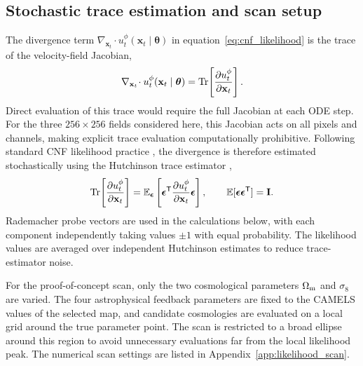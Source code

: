 \documentclass{article}
\newcommand{\Om}{\Omega_{\rm m}}
\newcommand{\sig}{\sigma_8}
\newcommand{\thetavec}{\boldsymbol{\theta}}
\begin{document}
\subsection{Stochastic trace estimation and scan setup}
\label{sec:likelihood_hutchinson}
The divergence term
$\nabla_{\mathbf{x}_t}\!\cdot
u_t^\phi(\mathbf{x}_t\mid\thetavec)$ in
equation~\eqref{eq:cnf_likelihood} is the trace of the velocity-field
Jacobian,
\begin{equation}
  \nabla_{\mathbf{x}_t}\!\cdot
  u_t^\phi(\mathbf{x}_t\mid\thetavec)
  =
  {\rm Tr}\!\left[
    \frac{\partial u_t^\phi}{\partial \mathbf{x}_t}
  \right].
  \label{eq:trace_exact}
\end{equation}
Direct evaluation of this trace would require the full Jacobian at each
ODE step. For the three $256\times256$ fields considered here, this
Jacobian acts on all pixels and channels, making explicit trace
evaluation computationally prohibitive. Following standard CNF
likelihood practice \citep{Grathwohl2019,Lipman2023}, the divergence is
therefore estimated stochastically using the Hutchinson trace estimator
\citep{Hutchinson1989},
\begin{equation}
  {\rm Tr}\!\left[
    \frac{\partial u_t^\phi}{\partial \mathbf{x}_t}
  \right]
  =
  \mathbb{E}_{\boldsymbol{\epsilon}}
  \left[
    \boldsymbol{\epsilon}^{\mathsf T}
    \frac{\partial u_t^\phi}{\partial \mathbf{x}_t}
    \boldsymbol{\epsilon}
  \right],
  \qquad
  \mathbb{E}
  [\boldsymbol{\epsilon}\boldsymbol{\epsilon}^{\mathsf T}]
  =
  \mathbf{I}.
  \label{eq:hutchinson}
\end{equation}
Rademacher probe vectors are used in the calculations below, with each
component independently taking values $\pm1$ with equal probability.
The likelihood values are averaged over independent Hutchinson
estimates to reduce trace-estimator noise.

For the proof-of-concept scan, only the two cosmological parameters
$\Om$ and $\sig$ are varied. The four astrophysical feedback parameters
are fixed to the CAMELS values of the selected map, and candidate
cosmologies are evaluated on a local grid around the true parameter
point. The scan is restricted to a broad ellipse around this region to
avoid unnecessary evaluations far from the local likelihood peak. The
numerical scan settings are listed in Appendix~\ref{app:likelihood_scan}.
\end{document}

